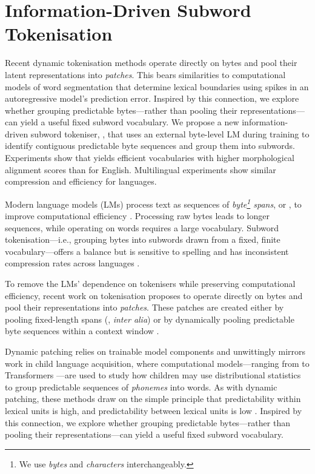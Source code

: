 \chapter{Information-Driven Subword Tokenisation}\label{chapter:infotokenisation}


Recent dynamic tokenisation methods operate directly on bytes and pool their latent representations into \textit{patches}. This bears similarities to computational models of word segmentation that determine lexical boundaries using spikes in an autoregressive model's prediction error. Inspired by this connection, we explore whether grouping predictable bytes---rather than pooling their representations---can yield a useful fixed subword vocabulary. We propose a new information-driven subword tokeniser, \tokname, that uses an external byte-level LM during training to identify contiguous predictable byte sequences and group them into subwords. Experiments show that \tokname yields efficient vocabularies with higher morphological alignment scores than \bpe for English. Multilingual experiments show similar compression and \renyi efficiency for  languages. 


Modern language models (LMs) process text as sequences of \textit{byte\footnote{We use \textit{bytes} and \textit{characters} interchangeably.} spans}, or , to improve computational efficiency \citep{zouhar-etal-2023-tokenization}.  Processing raw bytes leads to longer sequences, while operating on words requires a large vocabulary.  Subword tokenisation---i.e., grouping bytes into subwords drawn from a fixed, finite vocabulary---offers a balance but is sensitive to spelling \citep{chai-etal-2024-tokenization} and has inconsistent compression rates across languages \citep{rust-etal-2021}. 

To remove the LMs' dependence on tokenisers while preserving computational efficiency, recent work on tokenisation proposes to operate directly on bytes and pool their representations into \textit{patches}. These patches are created either by pooling fixed-length spans (\citealp{dai-etal-2020-funnel, nawrot-etal-2022-hierarchical, yu2023megabyte}, \textit{inter alia}) or by dynamically pooling predictable byte sequences within a context window \citep{nawrot-etal-2023-efficient, pagnoni2024byte}.

Dynamic patching relies on trainable model components and unwittingly mirrors work in child language acquisition, where computational models---ranging from \ngrams to Transformers \citep{vaswani2017attention}---are used to study how children may use distributional statistics to group predictable sequences of \textit{phonemes} into words. As with dynamic patching, these methods draw on the simple principle that predictability within lexical units is high, and predictability between lexical units is low \citep{harris1955}. Inspired by this connection, we explore whether grouping predictable bytes---rather than pooling their representations---can yield a useful fixed subword vocabulary.

